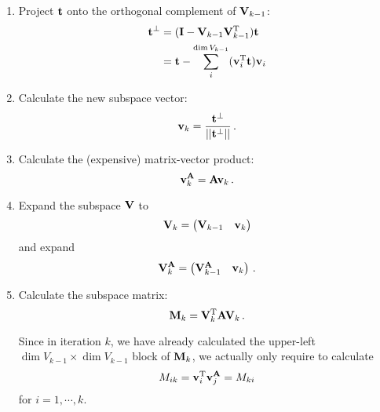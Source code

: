         \begin{enumerate}
            \item Project $\vb{t}$ onto the orthogonal complement of $\vb{V}_{k-1}$:
                \begin{align}
                    \vb{t}^{\perp} &= (\vb{I} - \vb{V}_{k-1} \vb{V}_{k-1}^{\text{T}}) \vb{t} \\
                    &= \vb{t} - \sum_i^{\dim{V_{k-1}}} (\vb{v}_i^{\text{T}} \vb{t}) \vb{v}_i
                \end{align}

            \item Calculate the new subspace vector:
                \begin{equation}
                    \vb{v}_k = \frac{\vb{t}^\perp}{|| \vb{t}^\perp ||} \thinspace .
                \end{equation}

            \item Calculate the (expensive) matrix-vector product:
                \begin{equation}
                    \vb{v}^{\vb{A}}_k = \vb{A} \vb{v}_k \thinspace .
                \end{equation}

            \item Expand the subspace $\vb{V}$ to
                \begin{equation}
                    \vb{V}_k = \begin{pmatrix} \vb{V}_{k-1} & \vb{v}_k \end{pmatrix}
                \end{equation}
                and expand
                \begin{equation}
                    \vb{V}^{\vb{A}}_k = \begin{pmatrix} \vb{V}^{\vb{A}}_{k-1} & \vb{v}_k \end{pmatrix} \thinspace .
                \end{equation}

            \item Calculate the subspace matrix:
                \begin{equation}
                    \vb{M}_k = \vb{V}^{\text{T}}_k \vb{A} \vb{V}_k \thinspace .
                \end{equation}

                Since in iteration $k$, we have already calculated the upper-left $\dim{V_{k-1}} \times \dim{V_{k-1}}$ block of $\vb{M}_k$, we actually only require to calculate
                \begin{equation}
                    M_{ik} = \vb{v}_i^{\text{T}} \vb{v}_j^{\vb{A}} = M_{ki}
                \end{equation}
                for $i = 1, \cdots, k$.


\end{enumerate}
